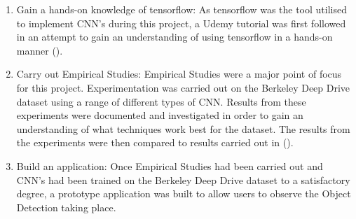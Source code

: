 \documentclass[12pt]{report}
\begin{document}
\begin{flushleft}
\begin{enumerate}
\item Gain a hands-on knowledge of tensorflow: As tensorflow was the tool utilised to implement CNN's during this project, a Udemy tutorial was first followed in an attempt to gain an understanding of using tensorflow in a hands-on manner (\cite{udemy}).
\item Carry out Empirical Studies: Empirical Studies were a major point of focus for this project. Experimentation was carried out on the Berkeley Deep Drive dataset using a range of different types of CNN. Results from these experiments were documented and investigated in order to gain an understanding of what techniques work best for the dataset. The results from the experiments were then compared to results carried out in (\cite{yu2018bdd100k}).
\item Build an application: Once Empirical Studies had been carried out and CNN's had been trained on the Berkeley Deep Drive dataset to a satisfactory degree, a prototype application was built to allow users to observe the Object Detection taking place.
\end{enumerate}
\end{flushleft}
\end{document}
